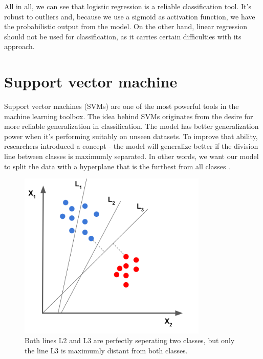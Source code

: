 \documentclass[times, utf8, seminar]{fer}
\begin{document}

All in all, we can see that logistic regression is a reliable classification tool. It's robust to outliers and, because we use a sigmoid as activation function, we have the probabilistic output from the model. On the other hand, linear regression should not be used for classification, as it carries certain difficulties with its approach.

\newpage

\section{Support vector machine}

Support vector machines (SVMs) are one of the most powerful tools in the machine learning toolbox. The idea behind SVMs originates from the desire for more reliable generalization in classification. The model has better generalization power when it's performing suitably on unseen datasets. To improve that ability, researchers introduced a concept - the model will generalize better if the division line between classes is maximumly separated. In other words, we want our model to split the data with a hyperplane that is the furthest from all classes \citep{svm}. 

\begin{figure}[h]
	\centering
	\includegraphics[width=9cm]{svm}
	\caption{Both lines L2 and L3 are perfectly seperating two classes, but only the line L3 is maximumly distant from both classes. \protect \footnotemark}
\end{figure}

\end{document}
